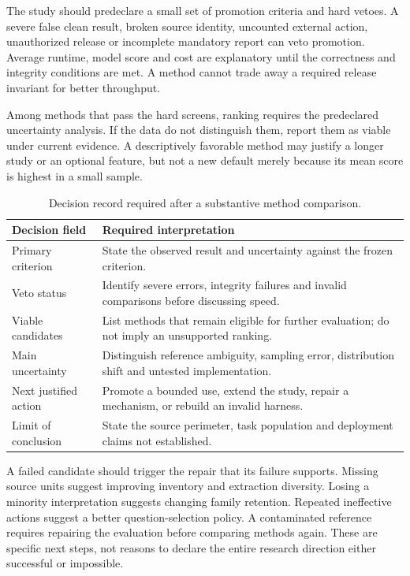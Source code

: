 \documentclass[12pt,a4paper,oneside,openany]{book}
\begin{document}
The study should predeclare a small set of promotion criteria and hard vetoes.
A severe false clean result, broken source identity, uncounted external action,
unauthorized release or incomplete mandatory report can veto promotion. Average
runtime, model score and cost are explanatory until the correctness and integrity
conditions are met. A method cannot trade away a required release invariant for
better throughput.

Among methods that pass the hard screens, ranking requires the predeclared
uncertainty analysis. If the data do not distinguish them, report them as viable
under current evidence. A descriptively favorable method may justify a longer
study or an optional feature, but not a new default merely because its mean score
is highest in a small sample.

\begin{table}[htbp]
\centering\small
\caption{Decision record required after a substantive method comparison.}
\begin{tabularx}{\textwidth}{P{39mm}Y}
\toprule
Decision field & Required interpretation\\\midrule
Primary criterion & State the observed result and uncertainty against the frozen criterion.\\
Veto status & Identify severe errors, integrity failures and invalid comparisons before discussing speed.\\
Viable candidates & List methods that remain eligible for further evaluation; do not imply an unsupported ranking.\\
Main uncertainty & Distinguish reference ambiguity, sampling error, distribution shift and untested implementation.\\
Next justified action & Promote a bounded use, extend the study, repair a mechanism, or rebuild an invalid harness.\\
Limit of conclusion & State the source perimeter, task population and deployment claims not established.\\
\bottomrule
\end{tabularx}
\end{table}

A failed candidate should trigger the repair that its failure supports. Missing
source units suggest improving inventory and extraction diversity. Losing a
minority interpretation suggests changing family retention. Repeated ineffective
actions suggest a better question-selection policy. A contaminated reference
requires repairing the evaluation before comparing methods again. These are
specific next steps, not reasons to declare the entire research direction either
successful or impossible.
\end{document}
